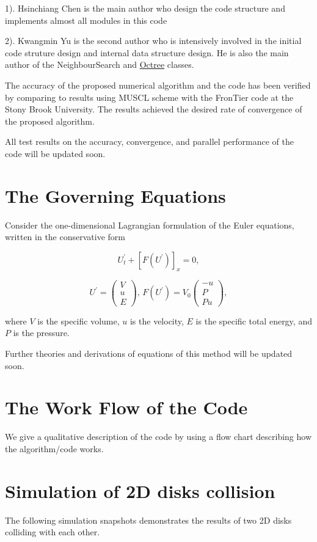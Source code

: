 1). Hsinchiang Chen is the main author who design the code structure and implements almost all modules in this code\par
2). Kwangmin Yu is the second author who is intensively involved in the initial code struture design and internal data structure design. He is also the main author of the Neighbour\-Search and \hyperlink{classOctree}{Octree} classes.\par
 The accuracy of the proposed numerical algorithm and the code has been verified by comparing to results using M\-U\-S\-C\-L scheme with the Fron\-Tier code at the Stony Brook University. The results achieved the desired rate of convergence of the proposed algorithm.\par
 All test results on the accuracy, convergence, and parallel performance of the code will be updated soon.\hypertarget{index_sec3}{}\section{The Governing Equations}\label{index_sec3}
Consider the one-\/dimensional Lagrangian formulation of the Euler equations, written in the conservative form

\[ U_{t}^{'} + \left[ F(U^{'}) \right]_{x} = 0, \]

\[ U^{'} = \left( \begin{array} {c} V \\ u \\ E \end{array} \right), \, F(U^{'}) = V_{0} \left( \begin{array} {c} -u \\ P \\ Pu \end{array} \right), \]

where $V$ is the specific volume, $u$ is the velocity, $E$ is the specific total energy, and $P$ is the pressure.\par
 Further theories and derivations of equations of this method will be updated soon.\par
\hypertarget{index_sec4}{}\section{The Work Flow of the Code}\label{index_sec4}
We give a qualitative description of the code by using a flow chart describing how the algorithm/code works.

\hypertarget{index_sec5}{}\section{Simulation of 2\-D disks collision}\label{index_sec5}
The following simulation snapshots demonstrates the results of two 2\-D disks colliding with each other.

